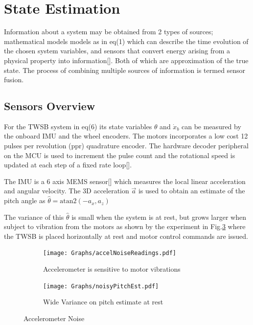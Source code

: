     \section{State Estimation}
    Information about a system may be obtained from 2 types of sources; 
    mathematical models models as in eq(1) which can describe the time evolution of the chosen system variables, 
    and sensors that convert energy arising from a physical property into information[]. Both of which are approximation of the true state. 
    The process of combining multiple sources of information is termed sensor fusion.

    \subsection{Sensors Overview}
        For the TWSB system in eq(6) its state variables $\theta$ and $\dot x_b$ can be measured by the onboard IMU and the wheel encoders.
        The motors incorporates a low cost 12 pulses per revolution (ppr) quadrature encoder. The hardware decoder peripheral on the MCU
        is used to increment the pulse count and the rotational speed is updated at each step of a fixed rate loop[].
        
        The IMU is a 6 axis MEMS sensor[] which measures the local linear acceleration 
        and angular velocity.
        The 3D acceleration $\vec{a}$ is used to obtain an 
        estimate of the pitch angle as    $\hat{\theta} = \mathrm{atan2}\left(-a_x ,a_z \right)$

        The variance of this $\hat{\theta}$ is small when the system is at rest, but grows larger when subject to vibration from the motors
        as shown by the experiment in Fig.\ref{fig:accelNoise} where the TWSB is placed horizontally at rest and motor control commands are issued. 
        \begin{figure}[H]
            \centering
            \begin{subfigure}[b]{0.5\textwidth}

                \texttt{[image: Graphs/accelNoiseReadings.pdf]}
                \caption{Accelerometer is sensitive to motor vibrations}
                \label{fig:accelRaw}
                
            \end{subfigure}
            \hfill
            \begin{subfigure}[b]{0.45\textwidth}
                \texttt{[image: Graphs/noisyPitchEst.pdf]}
                \caption{Wide Variance on pitch estimate at rest}
                \label{fig:pitchNoise}
            \label{fig:accelNoise}
            \end{subfigure}
            \caption{Accelerometer Noise}   
        \end{figure}

